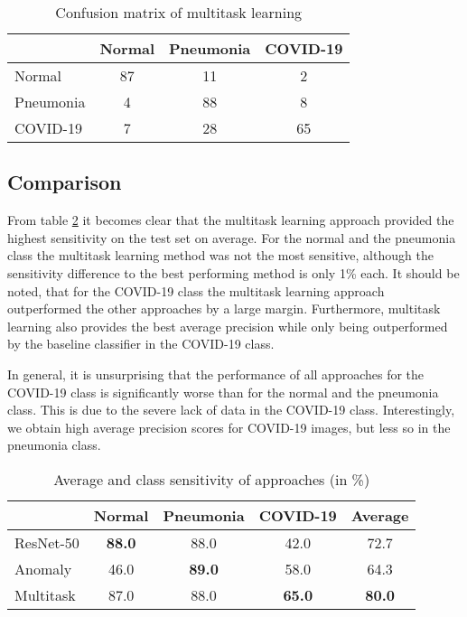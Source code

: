 \documentclass[conference]{IEEEtran}
\begin{document}
\begin{table}[h!]
\centering
\caption{Confusion matrix of multitask learning}
\begin{tabular}{|l|c|c|c|}
\hline
 & Normal & Pneumonia & COVID-19 \\ \hline
Normal & 87 & 11 & 2 \\ \hline
Pneumonia & 4 & 88 & 8 \\ \hline
COVID-19 & 7 & 28 & 65 \\ \hline
\end{tabular}
\label{tab:multitask_conf}
\end{table}

\subsection{Comparison}

From table \ref{tab:sensitivity} it becomes clear that the multitask learning approach provided the highest sensitivity on the test set on average. For the normal and the pneumonia class the multitask learning method was not the most sensitive, although the sensitivity difference to the best performing method is only 1\% each. It should be noted, that for the COVID-19 class the multitask learning approach outperformed the other approaches by a large margin. Furthermore, multitask learning also provides the best average precision while only being outperformed by the baseline classifier in the COVID-19 class.

In general, it is unsurprising that the performance of all approaches for the COVID-19 class is significantly worse than for the normal and the pneumonia class. This is due to the severe lack of data in the COVID-19 class. Interestingly, we obtain high average precision scores for COVID-19 images, but less so in the pneumonia class.  

\begin{table}[]
\centering
\caption{Average and class sensitivity of approaches (in \%)}
\begin{tabular}{|l|c|c|c|c|}
\hline
 & Normal & Pneumonia & COVID-19 & Average \\ \hline
ResNet-50 & \textbf{88.0} & 88.0 & 42.0 & 72.7 \\ \hline
Anomaly & 46.0 & \textbf{89.0} & 58.0 & 64.3 \\ \hline
Multitask & 87.0 & 88.0 & \textbf{65.0} & \textbf{80.0} \\ \hline
\end{tabular}
\label{tab:sensitivity}
\end{table}
\end{document}
